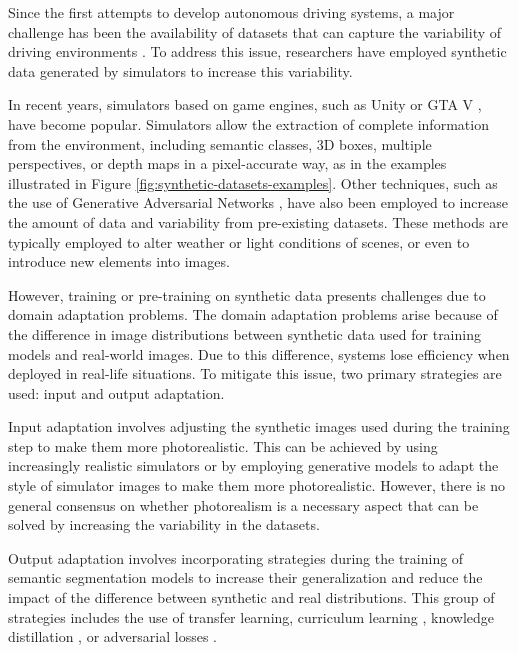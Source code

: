 Since the first attempts to develop autonomous driving systems, a major challenge has been the availability of datasets that can capture the variability of driving environments \cite{pomerleau:alvinn}. To address this issue, researchers have employed synthetic data generated by simulators to increase this variability.

In recent years, simulators based on game engines, such as Unity \cite{kitty, SYNTHIA} or GTA V \cite{gtav}, have become popular. Simulators allow the extraction of complete information from the environment, including semantic classes, 3D boxes, multiple perspectives, or depth maps in a pixel-accurate way, as in the examples illustrated in Figure \ref{fig:synthetic-datasets-examples}. 
Other techniques, such as the use of Generative Adversarial Networks \cite{NIPS2014_5ca3e9b1}, have also been employed to increase the amount of data and variability from pre-existing datasets. These methods are typically employed to alter weather or light conditions of scenes, or even to introduce new elements into images.

However, training or pre-training on synthetic data presents challenges due to domain adaptation problems. The domain adaptation problems arise because of the difference in image distributions between synthetic data used for training models and real-world images. Due to this difference, systems lose efficiency when deployed in real-life situations. To mitigate this issue, two primary strategies are used: input and output adaptation.

Input adaptation involves adjusting the synthetic images used during the training step to make them more photorealistic. This can be achieved by using increasingly realistic simulators or by employing generative models to adapt the style of simulator images to make them more photorealistic. However, there is no general consensus on whether photorealism is a necessary aspect that can be solved by increasing the variability in the datasets.

Output adaptation involves incorporating strategies during the training of semantic segmentation models to increase their generalization and reduce the impact of the difference between synthetic and real distributions. This group of strategies includes the use of transfer learning, curriculum learning \cite{Zhang2017}, knowledge distillation \cite{Tung2019SimilarityPreservingKD}, or adversarial losses \cite{Tsai_adaptseg_2018}.

